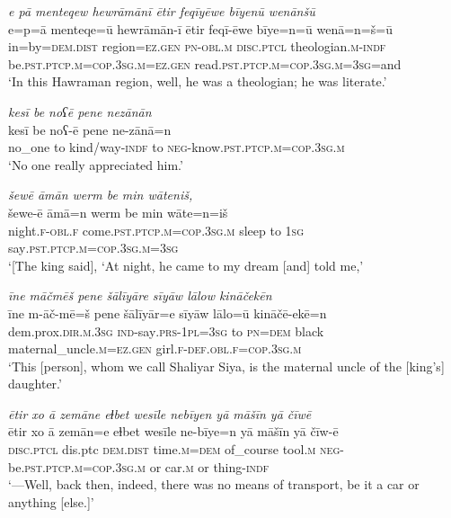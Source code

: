 \ea \label{ZP.23}
\textit{e pā menteqew hewrāmānī ētir feqīyēwe bīyenū wenānšū} \\ 
\gll e=p=ā menteqe=ū hewrāmān-ī ētir feqī-ēwe bīye=n=ū wenā=n=š=ū \\ 
 in=by=\textsc{dem.dist} region\textsc{\textsc{=ez.gen}} \textsc{pn}\textsc{-obl}\textsc{.m} \textsc{disc.ptcl} theologian\textsc{.m}\textsc{-indf} be\textsc{.pst}\textsc{.ptcp}\textsc{.m}\textsc{=cop}\textsc{.3sg}\textsc{.m}\textsc{\textsc{=ez.gen}} read\textsc{.pst}\textsc{.ptcp}\textsc{.m}\textsc{=cop}\textsc{.3sg}\textsc{.m}\textsc{=3sg}=and \\ 
\glt `In this Hawraman region, well, he was a theologian; he was literate.'
\z 
 
\ea \label{ZP.24}
\textit{kesī be noʕē pene nezānān} \\ 
\gll kesī be noʕ-ē pene ne-zānā=n \\ 
 no\_one to kind/way\textsc{-indf} to \textsc{neg-}know\textsc{.pst}\textsc{.ptcp}\textsc{.m}\textsc{=cop}\textsc{.3sg}\textsc{.m} \\ 
\glt `No one really appreciated him.'
\z 
 
\ea \label{ZP.32}
\textit{šewē āmān werm be min wāteniš,} \\ 
\gll šewe-ē āmā=n werm be min wāte=n=iš \\ 
 night\textsc{.f}\textsc{-obl}\textsc{.f} come\textsc{.pst}\textsc{.ptcp}\textsc{.m}\textsc{=cop}\textsc{.3sg}\textsc{.m} sleep to \textsc{1sg} say\textsc{.pst}\textsc{.ptcp}\textsc{.m}\textsc{=cop}\textsc{.3sg}\textsc{.m}\textsc{=3sg} \\ 
\glt `[The king said], ‘At night, he came to my dream [and] told me,'
\z 
 
\ea \label{ZP.36}
\textit{īne māčmēš pene šālīyāre sīyāw lālow kināčekēn} \\ 
\gll īne m-āč-mē=š pene šālīyār=e sīyāw lālo=ū kināčē-ekē=n \\ 
 dem.prox\textsc{.dir}\textsc{.m}\textsc{.3sg} \textsc{ind-}say\textsc{.prs}\textsc{-1pl}\textsc{=3sg} to \textsc{pn}\textsc{=dem} black maternal\_uncle\textsc{.m}\textsc{\textsc{=ez.gen}} girl\textsc{.f}\textsc{-def}\textsc{.obl}\textsc{.f}\textsc{=cop}\textsc{.3sg}\textsc{.m} \\ 
\glt `This [person], whom we call Shaliyar Siya, is the maternal uncle of the [king’s] daughter.'
\z 
 
\ea \label{ZP.40}
\textit{ētir xo ā zemāne eɫbet wesīle nebīyen yā māšīn yā čīwē} \\ 
\gll ētir xo ā zemān=e eɫbet wesīle ne-bīye=n yā māšīn yā čīw-ē \\ 
 \textsc{disc.ptcl} dis.ptc \textsc{dem.dist} time\textsc{.m}\textsc{=dem} of\_course tool\textsc{.m} \textsc{neg-}be\textsc{.pst}\textsc{.ptcp}\textsc{.m}\textsc{=cop}\textsc{.3sg}\textsc{.m} or car\textsc{.m} or thing\textsc{-indf} \\ 
\glt `—Well, back then, indeed, there was no means of transport, be it a car or anything [else.]'
\z 
 
